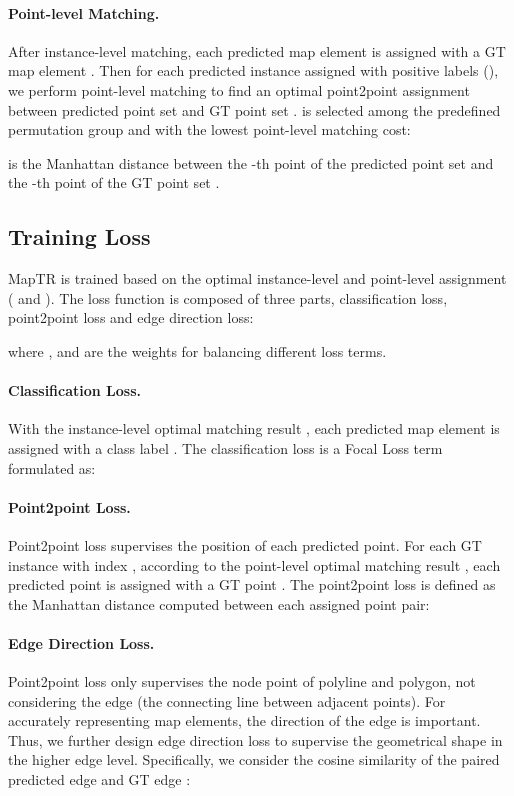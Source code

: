 \documentclass{article} \usepackage{iclr2023_conference,times}
\newcommand{\oldnew}[2]{#2}
\begin{document}
\paragraph{Point-level Matching.}
After instance-level matching,  each predicted map element   is assigned with a GT map element .
Then for each predicted instance assigned with positive labels (), we perform point-level matching
to find an optimal point2point assignment  between predicted point set  and GT point set .  is selected among the predefined permutation group  and with the lowest point-level matching cost:

 is the Manhattan distance between the -th point of the predicted point set  and the -th point of the GT point set . 


\subsection{Training Loss
\label{sec:e2e-training}} 
MapTR is trained based on the optimal instance-level and point-level assignment ( and ).
The loss function is composed of three parts, classification loss, point2point loss and edge direction loss:

where ,  and  are the weights for balancing different loss terms.


\paragraph{Classification Loss.}
With  the  instance-level  optimal matching result ,
each predicted map element is assigned with a class label \oldnew{(or 'no object' )}{}. The classification loss is a Focal Loss term formulated as:




\paragraph{Point2point Loss.}
Point2point loss supervises the position of each predicted point.
For each GT instance with index ,
according to  the  point-level optimal matching result ,
each predicted point  is assigned with a GT point . 
The point2point loss is defined  as the Manhattan distance computed between each assigned point pair:



\paragraph{Edge Direction Loss.}
Point2point loss only supervises the node point of polyline and polygon, not considering the edge (the connecting line between adjacent points).
For accurately representing map elements, the direction of the edge is
important.
Thus, we further design edge direction loss to
supervise the geometrical shape in the higher edge level.
Specifically, we consider the  cosine similarity of the paired predicted edge  and GT edge :
  
\end{document}
